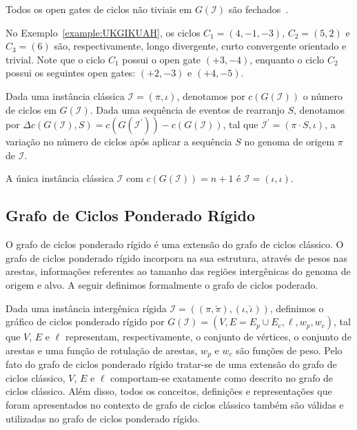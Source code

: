 \begin{remark}\label{remark:JBJWNCKF}
Todos os open gates de ciclos não tiviais em $G(\mathcal{I})$ são fechados~\cite{2019a-oliveira-etal}.
\end{remark}

No Exemplo~\ref{example:UKGIKUAH}, os ciclos $C_1=(4,-1,-3)$, $C_2 = (5,2)$ e $C_3 = (6)$ são, respectivamente, longo divergente, curto convergente orientado e trivial. Note que o ciclo $C_1$ possui o open gate $({+3},{-4})$, enquanto o ciclo $C_2$ possui os seguintes open gates: $({+2},{-3})$ e $({+4},{-5})$.

Dada uma instância clássica $\mathcal{I} = (\pi,\iota)$, denotamos por $c(G(\mathcal{I}))$ o número de ciclos em $G(\mathcal{I})$. Dada uma sequência de eventos de rearranjo $S$, denotamos por $\Delta c(G(\mathcal{I}), S) = c(G(\mathcal{I^{\prime}})) - c(G(\mathcal{I}))$, tal que $\mathcal{I^{\prime}} = (\pi \cdot S,\iota)$, a variação no número de ciclos após aplicar a sequência $S$ no genoma de origem $\pi$ de $\mathcal{I}$.

\begin{remark}\label{remark:OYRVGHTB}
  A única instância clássica $\mathcal{I}$ com $c(G(\mathcal{I})) = n + 1$ é $\mathcal{I} = (\iota,\iota)$.
\end{remark}

\subsection{Grafo de Ciclos Ponderado Rígido}

O grafo de ciclos ponderado rígido é uma extensão do grafo de ciclos clássico. O grafo de ciclos ponderado rígido incorpora na sua estrutura, através de pesos nas arestas, informações referentes ao tamanho das regiões intergênicas do genoma de origem e alvo. A seguir definimos formalmente o grafo de ciclos poderado.

Dada uma instância intergênica rígida $\mathcal{I} = ((\pi,\breve\pi),(\iota,\breve\iota))$, definimos o gráfico de ciclos ponderado rígido por $G(\mathcal{I}) = (V, E=E_p \cup E_c, \ell, w_p, w_c)$, tal que $V$, $E$ e $\ell$ representam, respectivamente, o conjunto de vértices, o conjunto de arestas e uma função de rotulação de arestas, $w_p$ e $w_c$ são funções de peso. Pelo fato do grafo de ciclos ponderado rígido tratar-se de uma extensão do grafo de ciclos clássico, $V$, $E$ e $\ell$ comportam-se exatamente como descrito no grafo de ciclos clássico. Além disso, todos os conceitos, definições e representações que foram apresentados no contexto de grafo de ciclos clássico também são válidas e utilizadas no grafo de ciclos ponderado rígido.

